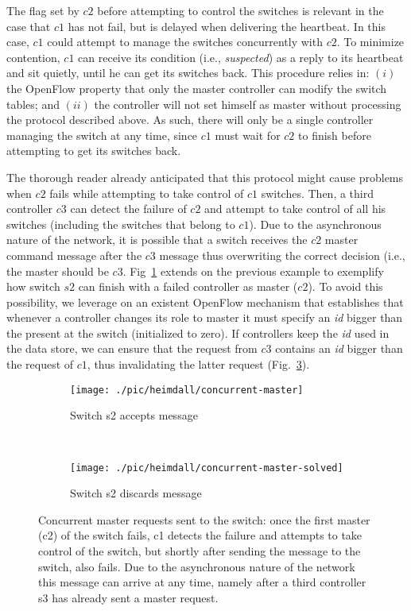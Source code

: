 The flag set by $c2$ before attempting to control the switches is relevant in the case that $c1$ has not fail, but is delayed when delivering the heartbeat. In this case, $c1$ could attempt to manage the switches concurrently with $c2$. To minimize contention, $c1$ can receive its condition (i.e., \emph{suspected}) as a reply to its heartbeat and sit quietly, until he can get its switches back. 
This procedure relies in: $(i)$ the OpenFlow property that only the master controller can modify the switch tables; and $(ii)$ the controller will not set himself as master without processing the protocol described above.
 As such, there will only be a single controller managing the switch at any time, since $c1$ must wait for $c2$ to finish before attempting to get its switches back.

The thorough reader already anticipated that this protocol might cause problems when $c2$ fails while attempting to take control of $c1$ switches. 
Then, a third controller $c3$ can detect the failure of $c2$ and attempt to take control of all his switches (including  the switches that belong to $c1$). 
Due to the asynchronous nature of the network, it is possible that a switch receives  the $c2$ master command message after the  $c3$ message thus overwriting the correct decision (i.e., the master should be $c3$. 
Fig~\ref{fig:concurrent-master-accept} extends on the previous example to exemplify how switch $s2$ can finish with a failed controller as master ($c2$). 
To avoid this possibility, we leverage on an existent OpenFlow mechanism that establishes that whenever a controller changes its role to master it must specify an \emph{id} bigger than the present at the switch (initialized to zero). 
If controllers keep the \emph{id} used in the data store, we can ensure that the request from $c3$ contains an \emph{id} bigger than the request of $c1$, thus invalidating  the latter request (Fig.~\ref{fig:concurrent-master-discard}).  



\begin{figure}
  \centering
\begin{subfigure}[b]{0.5\textwidth}
  \centering
  \texttt{[image: ./pic/heimdall/concurrent-master]}
  \caption{Switch s2 accepts message}
\label{fig:concurrent-master-accept}
\end{subfigure}%
        ~
        \begin{subfigure}[b]{0.5\textwidth}
                \centering
               \texttt{[image: ./pic/heimdall/concurrent-master-solved]}
                \caption{Switch s2 discards message}
\label{fig:concurrent-master-discard}
        \end{subfigure}
        \caption[Concurrent masters.]{Concurrent master requests sent to the switch: once the first master (c2) of the switch fails, c1 detects the failure and attempts to take control of the switch, but shortly after sending the message to the switch, also fails. Due to the asynchronous nature of the network this message can arrive at any time, namely after a third controller s3 has already sent a master request.}
\end{figure}

